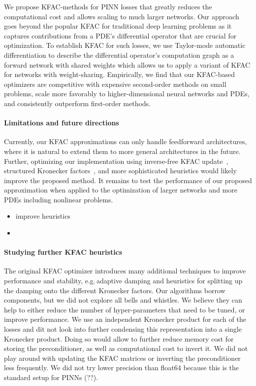 
We propose KFAC-methods for PINN losses that greatly reduces the computational cost and allows scaling to much larger networks.
Our approach goes beyond the popular KFAC for traditional deep learning problems as it captures contributions from a PDE's differential operator that are crucial for optimization.
To establish KFAC for such losses, we use Taylor-mode automatic differentiation to describe the differential operator's computation graph as a forward network with shared weights which allows us to apply a variant of KFAC for networks with weight-sharing.
Empirically, we find that our KFAC-based optimizers are competitive with expensive second-order methods on small problems, scale more favorably to higher-dimensional neural networks and PDEs, and consistently outperform first-order methods.

\paragraph{Limitations and future directions}
Currently, our KFAC approximations can only handle feedforward architectures, where it is natural to extend them to more general architectures in the future.
Further, optimizing our implementation using inverse-free KFAC update~\citep{lin2023simplifying}, structured Kronecker factors~\citep{lin2023structured}, and more sophisticated heuristics would likely improve the proposed method.
It remains to test the performance of our proposed approximation when applied to the optimization of larger networks and more PDEs including nonlinear problems.
\begin{itemize}
    \item improve heuristics
    \item
\end{itemize}


\paragraph{Studying further KFAC heuristics} The original KFAC optimizer introduces many additional techniques to improve performance and stability, e.g.\,adaptive damping and heuristics for splitting up the damping onto the different Kronecker factors.
Our algorithms borrow components, but we did not explore all bells and whistles.
We believe they can help to either reduce the number of hyper-parameters that need to be tuned, or improve performance.
We use an independent Kronecker product for each of the losses and dit not look into further condensing this representation into a single Kronecker product.
Doing so would allow to further reduce memory cost for storing the preconditioner, as well as computational cost to invert it.
We did not play around with updating the KFAC matrices or inverting the preconditioner less frequently.
We did not try lower precision than float64 because this is the standard setup for PINNs (??).

